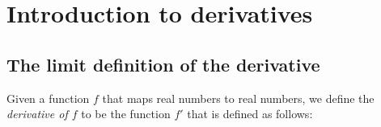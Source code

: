 \begin{comment}
\subsection*{On ``$f$ is a function of $x$''}

In precalculus, you are likely to have heard or read statements such as ``let $f$ be a function of $x$''. This is a somewhat vague phrase. To understand what is meant by it, consider the following context. 

Suppose you are doing some calculations in which you have force $F$ ``as a function of position $x$'' and position $x$ ``as a function of time $t$''. (Don't worry if you don't know what ``force'' actually is). Formally, we have a function $F_x$ that maps position to force and a function $x_t$ that maps time to position. From these functions, we can obtain a function $F_t$ that maps time to force, defined by $F_t(t) := F_x(x_t(t))$, i.e. $F_t = F_x \circ x_t$.

Let's now consider the situation from a more general perspective. Every symbol $S$ that represents a physical quantity (such as $F$, $x$, $t$) is associated with a ``preferred symbol'' $T$. To say that $S$ has preferred symbol $T$ is to say that we prefer to think of the physical quantity represented by $S$ as depending on the physical quantity represented by $T$ rather than as depending on some other physical quantity. 

In the above example, the preferred symbol of $F$ would be $x$, since we started with the functions $F_x$ and $x_t$. $F$'s preferred symbol is \textit{not} $t$, because we did not start with the function $F_t$, and instead had to deduce it from $F_x$ and $x_t$.

[TO DO]
\end{comment}







\newpage

\section*{Introduction to derivatives}

\subsection*{The limit definition of the derivative}

Given a function $f$ that maps real numbers to real numbers, we define the \textit{derivative of $f$} to be the function $f'$ that is defined as follows:
     
